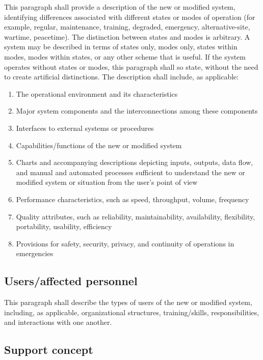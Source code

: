 \documentclass{fidata-report-template}
\begin{document}
This paragraph shall provide a description of the new or modified
system, identifying differences associated with different states or
modes of operation (for example, regular, maintenance, training,
degraded, emergency, alternative-site, wartime, peacetime). The
distinction between states and modes is arbitrary. A system may be
described in terms of states only, modes only, states within modes,
modes within states, or any other scheme that is useful. If the system
operates without states or modes, this paragraph shall so state, without
the need to create artificial distinctions. The description shall
include, as applicable:

\begin{enumerate}
\itemsep1pt\parskip0pt
\item
  The operational environment and its characteristics
\item
  Major system components and the interconnections among these
  components
\item
  Interfaces to external systems or procedures
\item
  Capabilities/functions of the new or modified system
\item
  Charts and accompanying descriptions depicting inputs, outputs, data
  flow, and manual and automated processes sufficient to understand the
  new or modified system or situation from the user's point of view
\item
  Performance characteristics, such as speed, throughput, volume,
  frequency
\item
  Quality attributes, such as reliability, maintainability,
  availability, flexibility, portability, usability, efficiency
\item
  Provisions for safety, security, privacy, and continuity of operations
  in emergencies
\end{enumerate}

\subsection{Users/affected personnel}

This paragraph shall describe the types of users of the new or modified
system, including, as applicable, organizational structures,
training/skills, responsibilities, and interactions with one another.

\subsection{Support concept}
\end{document}
